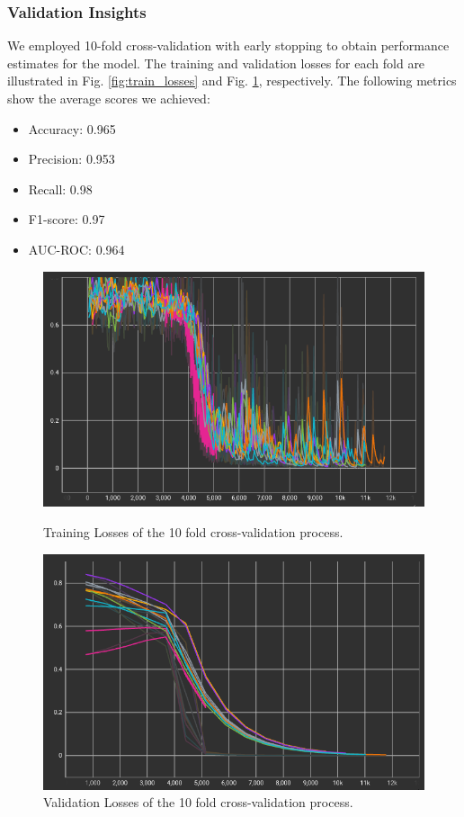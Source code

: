 \documentclass[a4paper,10pt]{report} %
\begin{document}
\subsubsection{Validation Insights}
We employed 10-fold cross-validation with early stopping to obtain performance estimates for the model. The training and validation losses for each fold are illustrated in Fig. \ref{fig:train_losses} and Fig. \ref{fig:valid_losses}, respectively. The following metrics show the average scores we achieved:
\begin{itemize}
  \item Accuracy: 0.965
  \item Precision: 0.953
  \item Recall: 0.98
  \item F1-score: 0.97
  \item AUC-ROC: 0.964
\end{itemize}

\begin{figure}[h]
  \begin{minipage}[b]{0.49\textwidth}
    \centering
    \includegraphics[width=\textwidth]{img/train_losses.png}
    \caption{Training Losses of the 10 fold cross-validation process.}
    \label{fig:train_losses}
  \end{minipage}
  \hfill
  \begin{minipage}[b]{0.49\textwidth}
    \centering
    \includegraphics[width=\textwidth]{img/valid_losses.png}
    \caption{Validation Losses of the 10 fold cross-validation process.}
    \label{fig:valid_losses}
  \end{minipage}
\end{figure}
\end{document}

